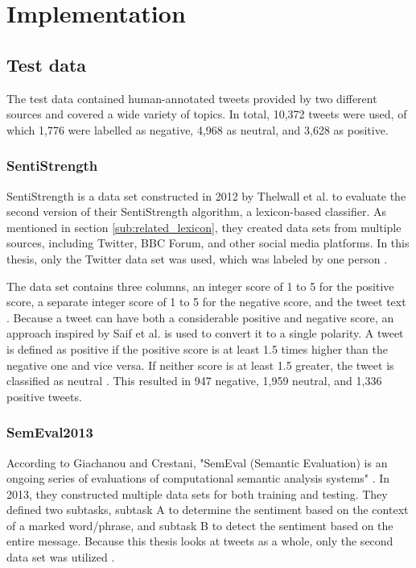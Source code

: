 \chapter{Implementation}
\label{cha:Chapter5_Implementation}
\section{Test data}
The test data contained human-annotated tweets provided by two different sources and covered a wide variety of topics. In total, 10,372 tweets were used, of which 1,776 were labelled as negative, 4,968 as neutral, and 3,628 as positive.

\subsection{SentiStrength}
SentiStrength is a data set constructed in 2012 by Thelwall et al. to evaluate the second version of their SentiStrength algorithm, a lexicon-based classifier. As mentioned in section \ref{sub:related_lexicon}, they created data sets from multiple sources, including Twitter, BBC Forum, and other social media platforms. In this thesis, only the Twitter data set was used, which was labeled by one person \cite{10.1002/asi.21662}.

The data set contains three columns, an integer score of 1 to 5 for the positive score, a separate integer score of 1 to 5 for the negative score, and the tweet text \cite{10.1002/asi.21662}. Because a tweet can have both a considerable positive and negative score, an approach inspired by Saif et al. is used to convert it to a single polarity. A tweet is defined as positive if the positive score is at least 1.5 times higher than the negative one and vice versa. If neither score is at least 1.5 greater, the tweet is classified as neutral \cite{oro40660}. This resulted in 947 negative, 1,959 neutral, and 1,336 positive tweets.

\subsection{SemEval2013}
According to Giachanou and Crestani, "SemEval (Semantic Evaluation) is an ongoing series of evaluations of computational semantic analysis systems" \cite[p.~28:31]{DBLP:journals/csur/GiachanouC16}. In 2013, they constructed multiple data sets for both training and testing. They defined two subtasks, subtask A to determine the sentiment based on the context of a marked word/phrase, and subtask B to detect the sentiment based on the entire message. Because this thesis looks at tweets as a whole, only the second data set was utilized \cite{nakov-etal-2013-semeval}.

